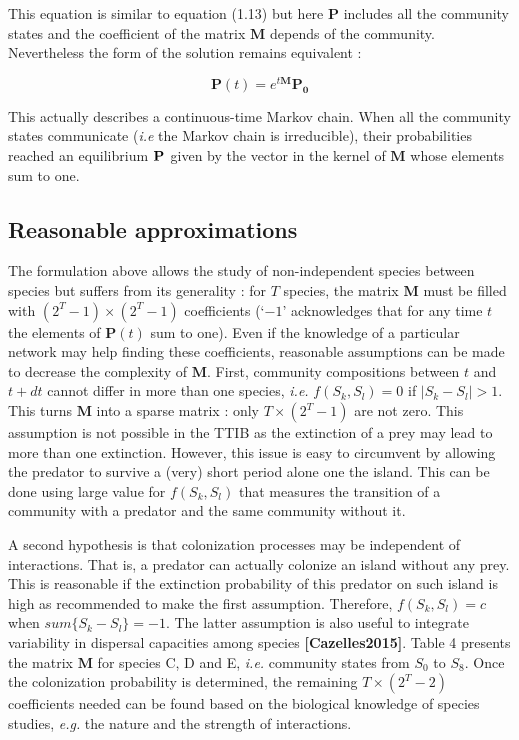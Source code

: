 This equation is similar to equation (1.13) but here \(\mathbf{P}\)
includes all the community states and the coefficient of the matrix
\(\mathbf{M}\) depends of the community. Nevertheless the form of the
solution remains equivalent :

\begin{equation}
\mathbf{P}(t) = e^{t\mathbf{M}}\mathbf{P_0}
\end{equation}

This actually describes a continuous-time Markov chain. When all the
community states communicate (\emph{i.e} the Markov chain is
irreducible), their probabilities reached an equilibrium
\(\mathbf{P}^{\*}\) given by the vector in the kernel of \(\mathbf{M}\)
whose elements sum to one.

\subsection{Reasonable approximations}\label{reasonable-approximations}

The formulation above allows the study of non-independent species
between species but suffers from its generality : for \(T\) species, the
matrix \(\mathbf{M}\) must be filled with \((2^T-1) \times (2^T-1)\)
coefficients (`\(-1\)' acknowledges that for any time \(t\) the elements
of \(\mathbf{P}(t)\) sum to one). Even if the knowledge of a particular
network may help finding these coefficients, reasonable assumptions can
be made to decrease the complexity of \(\mathbf{M}\). First, community
compositions between \(t\) and \(t+dt\) cannot differ in more than one
species, \emph{i.e.} \(f(S_k,S_l)=0\) if \(|S_k-S_l|>1\). This turns
\(\mathbf{M}\) into a sparse matrix : only \(T \times (2^T-1)\) are not
zero. This assumption is not possible in the TTIB as the extinction of a
prey may lead to more than one extinction. However, this issue is easy
to circumvent by allowing the predator to survive a (very) short period
alone one the island. This can be done using large value for
\(f(S_k,S_l)\) that measures the transition of a community with a
predator and the same community without it.

A second hypothesis is that colonization processes may be independent of
interactions. That is, a predator can actually colonize an island
without any prey. This is reasonable if the extinction probability of
this predator on such island is high as recommended to make the first
assumption. Therefore, \(f(S_k,S_l)=c\) when \(sum\{S_k-S_l\}=-1\). The
latter assumption is also useful to integrate variability in dispersal
capacities among species \textbf{{[}Cazelles2015{]}}. Table 4 presents
the matrix \(\mathbf{M}\) for species C, D and E, \emph{i.e.} community
states from \(S_0\) to \(S_8\). Once the colonization probability is
determined, the remaining \(T \times (2^T-2)\) coefficients needed can
be found based on the biological knowledge of species studies,
\emph{e.g.} the nature and the strength of interactions.

